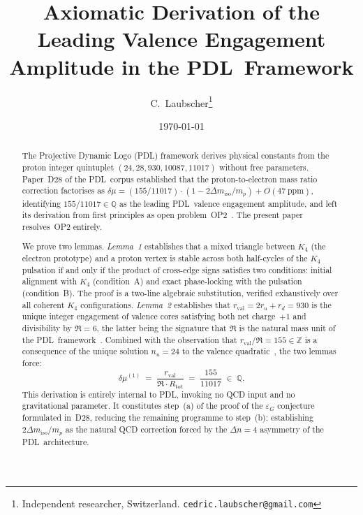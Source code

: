 \documentclass[11pt,a4paper]{article}
\theoremstyle{definition}
\newcommand{\PDL}{\textnormal{PDL}}
\newcommand{\Rtot}{R_{\mathrm{tot}}}
\newcommand{\rval}{r_{\mathrm{val}}}
\newcommand{\epsg}{\varepsilon_G}
\newcommand{\Kfour}{K_4}
\newcommand{\dmu}{\delta\mu}
\newcommand{\dmiso}{\Delta m_{\mathrm{iso}}}
\begin{document}
\title{Axiomatic Derivation of the Leading Valence Engagement\\[4pt] Amplitude in the \PDL\ Framework}
\author{C.~Laubscher\thanks{Independent researcher, Switzerland. \texttt{cedric.laubscher@gmail.com}}\\[4pt]}
\date{\small \today}
\maketitle

\begin{abstract}
The Projective Dynamic Logo (\PDL) framework derives physical constants from the proton integer quintuplet $(24, 28, 930, 10087, 11017)$ without free parameters. Paper~D28 of the \PDL\ corpus established that the proton-to-electron mass ratio correction factorises as $\dmu = (155/11017)\cdot(1 - 2\dmiso/m_p) + O(47\ \mathrm{ppm})$, identifying $155/11017 \in \mathbb{Q}$ as the leading \PDL\ valence engagement amplitude, and left its derivation from first principles as open problem~OP2~\cite{PDL_D28_2026}. The present paper resolves~OP2 entirely.

We prove two lemmas. \emph{Lemma~1} establishes that a mixed triangle between $\Kfour$ (the electron prototype) and a proton vertex is stable across both half-cycles of the $\Kfour$ pulsation if and only if the product of cross-edge signs satisfies two conditions: initial alignment with $\Kfour$ (condition~A) and exact phase-locking with the pulsation (condition~B). The proof is a two-line algebraic substitution, verified exhaustively over all coherent $\Kfour$ configurations. \emph{Lemma~2} establishes that $\rval = 2r_u + r_d = 930$ is the unique integer engagement of valence cores satisfying both net charge~$+1$ and divisibility by $\Re = 6$, the latter being the signature that $\Re$ is the natural mass unit of the \PDL\ framework~\cite{PDL_D27_2026}. Combined with the observation that $\rval/\Re = 155 \in \mathbb{Z}$ is a consequence of the unique solution $n_u = 24$ to the valence quadratic~\cite{Bridge_PDL_2026}, the two lemmas force:
\[
\dmu^{(1)} \;=\; \frac{\rval}{\Re\cdot\Rtot} \;=\; \frac{155}{11017} \;\in\; \mathbb{Q}.
\]
This derivation is entirely internal to \PDL, invoking no QCD input and no gravitational parameter. It constitutes step~(a) of the proof of the $\epsg$ conjecture formulated in~D28, reducing the remaining programme to step~(b): establishing $2\dmiso/m_p$ as the natural QCD correction forced by the $\Delta n = 4$ asymmetry of the \PDL\ architecture.
\end{abstract}
\end{document}
